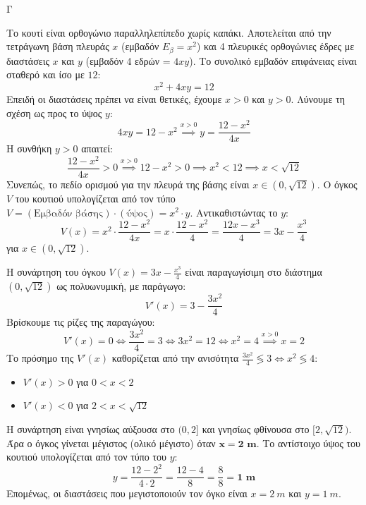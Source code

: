 \begin{thema}{Γ}
\begin{erwthma}
\item Το κουτί είναι ορθογώνιο παραλληλεπίπεδο χωρίς καπάκι. Αποτελείται από την τετράγωνη βάση πλευράς $x$ (εμβαδόν $E_{\beta} = x^2$) και 4 πλευρικές ορθογώνιες έδρες με διαστάσεις $x$ και $y$ (εμβαδόν 4 εδρών = $4xy$).
Το συνολικό εμβαδόν επιφάνειας είναι σταθερό και ίσο με $12$:
\[ x^2 + 4xy = 12 \]
Επειδή οι διαστάσεις πρέπει να είναι θετικές, έχουμε $x > 0$ και $y > 0$. Λύνουμε τη σχέση ως προς το ύψος $y$:
\[ 4xy = 12 - x^2 \overset{x>0}{\implies} y = \frac{12 - x^2}{4x} \]
Η συνθήκη $y > 0$ απαιτεί:
\[ \frac{12 - x^2}{4x} > 0 \overset{x>0}{\implies} 12 - x^2 > 0 \implies x^2 < 12 \implies x < \sqrt{12} \]
Συνεπώς, το πεδίο ορισμού για την πλευρά της βάσης είναι $x \in (0, \sqrt{12})$.
Ο όγκος $V$ του κουτιού υπολογίζεται από τον τύπο $V = (\text{Εμβαδόν βάσης}) \cdot (\text{ύψος}) = x^2 \cdot y$. Αντικαθιστώντας το $y$:
\[ V(x) = x^2 \cdot \frac{12 - x^2}{4x} = x \cdot \frac{12 - x^2}{4} = \frac{12x - x^3}{4} = 3x - \frac{x^3}{4} \]
για $x \in (0, \sqrt{12})$.

\item Η συνάρτηση του όγκου $V(x) = 3x - \frac{x^3}{4}$ είναι παραγωγίσιμη στο διάστημα $(0, \sqrt{12})$ ως πολυωνυμική, με παράγωγο:
\[ V'(x) = 3 - \frac{3x^2}{4} \]
Βρίσκουμε τις ρίζες της παραγώγου:
\[ V'(x) = 0 \Leftrightarrow \frac{3x^2}{4} = 3 \Leftrightarrow 3x^2 = 12 \Leftrightarrow x^2 = 4 \overset{x>0}{\implies} x = 2 \]
Το πρόσημο της $V'(x)$ καθορίζεται από την ανισότητα $\frac{3x^2}{4} \lessgtr 3 \Leftrightarrow x^2 \lessgtr 4$:
\begin{itemize}
    \item $V'(x) > 0$ για $0 < x < 2$
    \item $V'(x) < 0$ για $2 < x < \sqrt{12}$
\end{itemize}
\begin{center}
\end{center}
Η συνάρτηση είναι γνησίως αύξουσα στο $(0, 2]$ και γνησίως φθίνουσα στο $[2, \sqrt{12})$. Άρα ο όγκος γίνεται μέγιστος (ολικό μέγιστο) όταν $\boldsymbol{x = 2 \text{ m}}$. 
Το αντίστοιχο ύψος του κουτιού υπολογίζεται από τον τύπο του $y$:
\[ y = \frac{12 - 2^2}{4 \cdot 2} = \frac{12 - 4}{8} = \frac{8}{8} = \boldsymbol{1 \text{ m}} \]
Επομένως, οι διαστάσεις που μεγιστοποιούν τον όγκο είναι $x = 2\ \si{m}$ και $y = 1\ \si{m}$.


\end{erwthma}
\end{thema}

